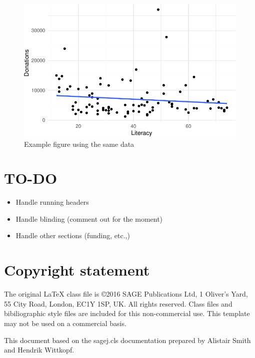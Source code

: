 \documentclass[
  Review,
  times,
  sageh]{sagej}
\providecommand{\tightlist}{%
  \setlength{\itemsep}{0pt}\setlength{\parskip}{0pt}}
\begin{document}
\begin{figure}

{\centering \includegraphics{template_files/figure-pdf/fig-literacy-1.pdf}

}

\caption{\label{fig-literacy}Example figure using the same data}

\end{figure}

\hypertarget{to-do}{%
\section{TO-DO}\label{to-do}}

\begin{itemize}
\tightlist
\item
  Handle running headers
\item
  Handle blinding (comment out for the moment)
\item
  Handle other sections (funding, etc.,)
\end{itemize}

\hypertarget{copyright-statement}{%
\section{Copyright statement}\label{copyright-statement}}

The original \LaTeX{} class file is \copyright 2016 SAGE Publications
Ltd, 1 Oliver's Yard, 55 City Road, London, EC1Y 1SP, UK. All rights
reserved. Class files and bibiliographic style files are included for
this non-commercial use. This template may not be used on a commercial
basis.

\renewcommand\refname{References}



\begin{acks}
  This document based on the sagej.cls documentation prepared by
  Alistair Smith and Hendrik Wittkopf.
\end{acks}
\end{document}
